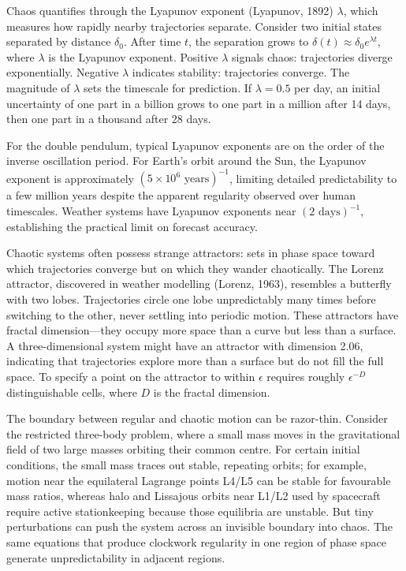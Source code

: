 Chaos quantifies through the Lyapunov exponent (Lyapunov, 1892) $\lambda$, which measures how rapidly nearby trajectories separate. Consider two initial states separated by distance $\delta_0$. After time $t$, the separation grows to $\delta(t) \approx \delta_0 e^{\lambda t}$, where $\lambda$ is the Lyapunov exponent. Positive $\lambda$ signals chaos: trajectories diverge exponentially. Negative $\lambda$ indicates stability: trajectories converge. The magnitude of $\lambda$ sets the timescale for prediction. If $\lambda = 0.5$ per day, an initial uncertainty of one part in a billion grows to one part in a million after 14 days, then one part in a thousand after 28 days.

For the double pendulum, typical Lyapunov exponents are on the order of the inverse oscillation period. For Earth's orbit around the Sun, the Lyapunov exponent is approximately $(5 \times 10^{6} \text{ years})^{-1}$, limiting detailed predictability to a few million years despite the apparent regularity observed over human timescales. Weather systems have Lyapunov exponents near $(2 \text{ days})^{-1}$, establishing the practical limit on forecast accuracy.

Chaotic systems often possess strange attractors: sets in phase space toward which trajectories converge but on which they wander chaotically. The Lorenz attractor, discovered in weather modelling (Lorenz, 1963), resembles a butterfly with two lobes. Trajectories circle one lobe unpredictably many times before switching to the other, never settling into periodic motion. These attractors have fractal dimension—they occupy more space than a curve but less than a surface. A three-dimensional system might have an attractor with dimension 2.06, indicating that trajectories explore more than a surface but do not fill the full space. To specify a point on the attractor to within $\epsilon$ requires roughly $\epsilon^{-D}$ distinguishable cells, where $D$ is the fractal dimension.

The boundary between regular and chaotic motion can be razor-thin. Consider the restricted three-body problem, where a small mass moves in the gravitational field of two large masses orbiting their common centre. For certain initial conditions, the small mass traces out stable, repeating orbits; for example, motion near the equilateral Lagrange points L4/L5 can be stable for favourable mass ratios, whereas halo and Lissajous orbits near L1/L2 used by spacecraft require active stationkeeping because those equilibria are unstable. But tiny perturbations can push the system across an invisible boundary into chaos. The same equations that produce clockwork regularity in one region of phase space generate unpredictability in adjacent regions.

